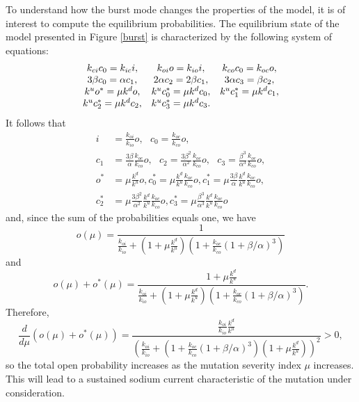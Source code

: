 To understand how the burst mode changes the properties of the model,
it is of interest to compute the equilibrium probabilities. 
The equilibrium state of the model presented in Figure \ref{burst} is
characterized by the following system of equations:
\begin{equation}
\begin{array}
[c]{ccc}
k_{ci}c_{0}=k_{ic}i, & k_{oi}o=k_{io}i, & k_{co}c_{0}=k_{oc}o,\\
3\beta c_{0}=\alpha c_{1}, & 2\alpha c_{2}=2\beta c_{1}, & 3\alpha c_{3}=\beta c_{2},\\
k^{u}o^{\ast}=\mu k^{d}o, & k^{u}c_{0}^{\ast}=\mu k^{d}c_{0}, & k^{u}
c_{1}^{\ast}=\mu k^{d}c_{1},\\
k^{u}c_{2}^{\ast}=\mu k^{d}c_{2}, & k^{u}c_{3}^{\ast}=\mu k^{d}c_{3}. &
\end{array}
\label{ep1}
\end{equation}
It follows that
\begin{align*}
i &  =\frac{k_{oi}}{k_{io}}o,\text{ }c_{0}=\frac{k_{oc}}{k_{co}}o,\text{ }\\
c_{1} &  =\frac{3\beta}{\alpha}\frac{k_{oc}}{k_{co}}o,\text{ }c_{2}
=\frac{3\beta^{2}}{\alpha^{2}}\frac{k_{oc}}{k_{co}}o,\text{ }c_{3}=\frac
{\beta^{3}}{\alpha^{3}}\frac{k_{oc}}{k_{co}}o,\\
o^{\ast} &  =\mu\frac{k^{d}}{k^{u}}o,c_{0}^{\ast}=\mu\frac{k^{d}}{k^{u}}
\frac{k_{oc}}{k_{co}}o,c_{1}^{\ast}=\mu\frac{3\beta}{\alpha}\frac{k^{d}}
{k^{u}}\frac{k_{oc}}{k_{co}}o,\\
c_{2}^{\ast} &  =\mu\frac{3\beta^{2}}{\alpha^{2}}\frac{k^{d}}{k^{u}}
\frac{k_{oc}}{k_{co}}o,c_{3}^{\ast}=\mu\frac{\beta^{3}}{\alpha^{3}}\frac
{k^{d}}{k^{u}}\frac{k_{oc}}{k_{co}}o
\end{align*}
and, since the sum of the probabilities equals one, we have
\[
o\left(  \mu\right)  =\frac{1}{\frac{k_{oi}}{k_{io}}+\left(  1+\mu\frac{k^{d}
}{k^{u}}\right)  \left(  1+\frac{k_{oc}}{k_{co}}\left(  1+\beta/\alpha\right)
^{3}\right)  }
\]
and
\[
o\left(  \mu\right)  +o^{\ast}\left(  \mu\right)  =\frac{1+\mu\frac{k^{d}
}{k^{u}}}{\frac{k_{oi}}{k_{io}}+\left(  1+\mu\frac{k^{d}}{k^{u}}\right)
\left(  1+\frac{k_{oc}}{k_{co}}\left(  1+\beta/\alpha\right)  ^{3}\right)  }.
\]
Therefore,
\[
\frac{d}{d\mu}\left(  o\left(  \mu\right)  +o^{\ast}\left(  \mu\right)
\right)  =\frac{\frac{k_{oi}}{k_{io}}\frac{k^{d}}{k^{u}}}{\left(  \frac
{k_{oi}}{k_{io}}+\left(  1+\frac{k_{oc}}{k_{co}}\left(  1+\beta/\alpha\right)
^{3}\right)  \left(  1+\mu\frac{k^{d}}{k^{u}}\right)  \right)  ^{2}}>0,
\]
so the total open probability increases as the mutation severity index
$\mu$ increases. This will lead to a sustained sodium current characteristic
of the mutation under consideration. 

